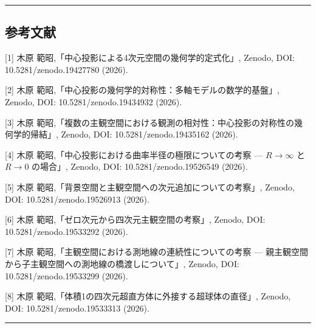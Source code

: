 \documentclass[a4paper,11pt]{ltjsarticle}
\theoremstyle{definition}
\begin{document}
\begin{center}\rule{0.5\linewidth}{0.5pt}\end{center}

\subsection{参考文献}\label{ux53c2ux8003ux6587ux732e}

{[}1{]} 木原 範昭,「中心投影による4次元空間の幾何学的定式化」, Zenodo,
DOI: 10.5281/zenodo.19427780 (2026).

{[}2{]} 木原 範昭,「中心投影の幾何学的対称性：多軸モデルの数学的基盤」,
Zenodo, DOI: 10.5281/zenodo.19434932 (2026).

{[}3{]} 木原
範昭,「複数の主観空間における観測の相対性：中心投影の対称性の幾何学的帰結」,
Zenodo, DOI: 10.5281/zenodo.19435162 (2026).

{[}4{]} 木原 範昭,「中心投影における曲率半径の極限についての考察 ---
\(R \to \infty\) と \(R \to 0\) の場合」, Zenodo, DOI:
10.5281/zenodo.19526549 (2026).

{[}5{]} 木原 範昭,「背景空間と主観空間への次元追加についての考察」,
Zenodo, DOI: 10.5281/zenodo.19526913 (2026).

{[}6{]} 木原 範昭,「ゼロ次元から四次元主観空間の考察」, Zenodo, DOI:
10.5281/zenodo.19533292 (2026).

{[}7{]} 木原 範昭,「主観空間における測地線の連続性についての考察 ---
親主観空間から子主観空間への測地線の橋渡しについて」, Zenodo, DOI:
10.5281/zenodo.19533299 (2026).

{[}8{]} 木原 範昭,「体積1の四次元超直方体に外接する超球体の直径」,
Zenodo, DOI: 10.5281/zenodo.19533313 (2026).

\begin{center}\rule{0.5\linewidth}{0.5pt}\end{center}
\end{document}
